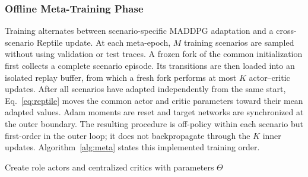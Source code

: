 \documentclass[journal]{IEEEtran}
\begin{document}
\subsubsection{Offline Meta-Training Phase}
Training alternates between scenario-specific MADDPG adaptation and a
cross-scenario Reptile update.  At each meta-epoch, $M$ training scenarios
are sampled without using validation or test traces.  A frozen fork of the
common initialization first collects a complete scenario episode.  Its
transitions are then loaded into an isolated replay buffer, from which a fresh
fork performs at most $K$ actor--critic updates.  After all scenarios have
adapted independently from the same start, Eq.~\eqref{eq:reptile} moves the
common actor and critic parameters toward their mean adapted values.  Adam
moments are reset and target networks are synchronized at the outer boundary.
The resulting procedure is off-policy within each scenario but first-order in
the outer loop; it does not backpropagate through the $K$ inner updates.
Algorithm~\ref{alg:meta} states this implemented training order.

\begin{algorithm}[!htbp]
\footnotesize
\caption{Meta-training of queue-aware hybrid R-MADDPG}
\label{alg:meta}
Create role actors and centralized critics with parameters $\Theta$\;
\end{algorithm}
\end{document}
